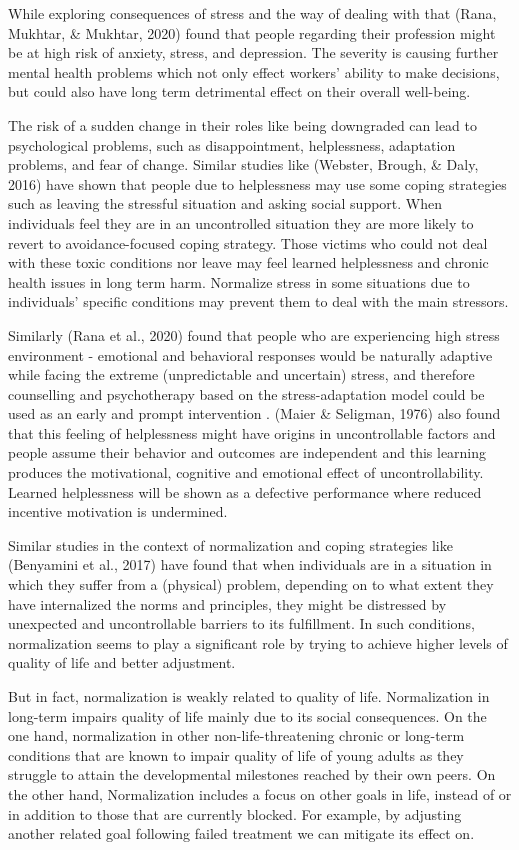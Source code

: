 \documentclass[
11pt, %
oneside, %
english, %
singlespacing, %
]{macthesis} %
\begin{document}
While exploring consequences of stress and the way of dealing with that (Rana, Mukhtar, \& Mukhtar, 2020) found that people regarding their profession might be at high risk of anxiety, stress, and depression. The severity is causing further mental health problems which not only effect workers' ability to make decisions, but could also have long term detrimental effect on their overall well-being.

The risk of a sudden change in their roles like being downgraded can lead to psychological problems, such as disappointment, helplessness, adaptation problems, and fear of change. Similar studies like (Webster, Brough, \& Daly, 2016) have shown that people due to helplessness may use some coping strategies such as leaving the stressful situation and asking social support. When individuals feel they are in an uncontrolled situation they are more likely to revert to avoidance-focused coping strategy. Those victims who could not deal with these toxic conditions nor leave may feel learned helplessness and chronic health issues in long term harm. Normalize stress in some situations due to individuals' specific conditions may prevent them to deal with the main stressors.

Similarly (Rana et al., 2020) found that people who are experiencing high stress environment - emotional and behavioral responses would be naturally adaptive while facing the extreme (unpredictable and uncertain) stress, and therefore counselling and psychotherapy based on the stress-adaptation model could be used as an early and prompt intervention . (Maier \& Seligman, 1976) also found that this feeling of helplessness might have origins in uncontrollable factors and people assume their behavior and outcomes are independent and this learning produces the motivational, cognitive and emotional effect of uncontrollability. Learned helplessness will be shown as a defective performance where reduced incentive motivation is undermined.

Similar studies in the context of normalization and coping strategies like (Benyamini et al., 2017) have found that when individuals are in a situation in which they suffer from a (physical) problem, depending on to what extent they have internalized the norms and principles, they might be distressed by unexpected and uncontrollable barriers to its fulfillment. In such conditions, normalization seems to play a significant role by trying to achieve higher levels of quality of life and better adjustment.

But in fact, normalization is weakly related to quality of life. Normalization in long-term impairs quality of life mainly due to its social consequences. On the one hand, normalization in other non-life-threatening chronic or long-term conditions that are known to impair quality of life of young adults as they struggle to attain the developmental milestones reached by their own peers. On the other hand, Normalization includes a focus on other goals in life, instead of or in addition to those that are currently blocked. For example, by adjusting another related goal following failed treatment we can mitigate its effect on.
\end{document}
